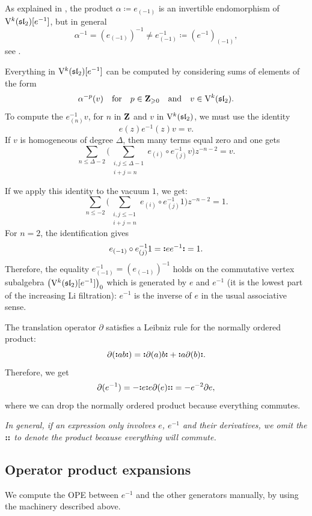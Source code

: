 As explained in \cite[Lemma 3.1 and before Lemma 3.3]{arakawa2026faithful}, the product $\alpha \coloneq e_{(-1)}$ is an invertible endomorphism of $\mathrm V^k(\mathfrak{sl}_2)[e^{-1}]$, but in general
\[ \alpha^{-1} = (e_{(-1)})^{-1} \neq e^{-1}_{(-1)} \coloneqq (e^{-1})_{(-1)}, \] 
see .

Everything in $\mathrm V^k(\mathfrak{sl}_2)[e^{-1}]$ can be computed by considering sums of elements of the form
\[ \alpha^{-p}(v) \quad \text{for} \quad p \in \mathbf{Z}_{\geqslant 0} \quad \text{and} \quad v \in \mathrm V^k(\mathfrak{sl}_2). \]
To compute the $e^{-1}_{(n)} v$, for $n$ in $\mathbf{Z}$ and $v$ in $\mathrm V^k(\mathfrak{sl}_2)$, we must use the identity
\[ e(z) e^{-1}(z) v = v. \]
If $v$ is homogeneous of degree $\Delta$, then many terms equal zero and one gets
\[ \sum_{n \leqslant \Delta - 2} \Big(\sum_{\substack{i, j \leqslant \Delta - 1 \\ i + j = n}} e_{(i)} \circ e^{-1}_{(j)} v \Big) z^{- n -2} = v. \]

If we apply this identity to the vacuum $1$, we get:
\[ \sum_{n \leqslant - 2} \Big(\sum_{\substack{i, j \leqslant - 1 \\ i + j = n}} e_{(i)} \circ e^{-1}_{(j)} 1 \Big) z^{- n -2} = 1. \]
For $n = 2$, the identification gives
\[ e_{(-1)} \circ e^{-1}_{(j)} 1 = \mathopen{\boldsymbol{\vcentcolon}} e e^{-1}\mathclose{\boldsymbol{\vcentcolon}} = 1. \]
Therefore, the equality $e^{-1}_{(-1)} = ( e_{(-1)})^{-1}$ holds on the commutative vertex subalgebra $\big(\mathrm V^k(\mathfrak{sl}_2)[e^{-1}]\big)_0$ which is generated by $e$ and $e^{-1}$ (it is the lowest part of the increasing Li filtration): $e^{-1}$ is the inverse of $e$ in the usual associative sense.

The translation operator $\partial$ satisfies a Leibniz rule for the normally ordered product:
\[ \partial(\mathopen{\boldsymbol{\vcentcolon}}ab\mathclose{\boldsymbol{\vcentcolon}}) = \mathopen{\boldsymbol{\vcentcolon}}\partial(a) b\mathclose{\boldsymbol{\vcentcolon}} + \mathopen{\boldsymbol{\vcentcolon}}a \partial(b)\mathclose{\boldsymbol{\vcentcolon}}. \]
Therefore, we get
\[ \partial(e^{-1}) = - \mathopen{\boldsymbol{\vcentcolon}}e \mathopen{\boldsymbol{\vcentcolon}}e \partial(e)\mathclose{\boldsymbol{\vcentcolon}}\mathclose{\boldsymbol{\vcentcolon}} = - e^{-2} \partial e, \]
where we can drop the normally ordered product because everything commutes.

\emph{In general, if an expression only involves $e$, $e^{-1}$ and their derivatives, we omit the $\mathopen{\boldsymbol{\vcentcolon}}\mathclose{\boldsymbol{\vcentcolon}}$ to denote the product because everything will commute.}

\subsection{Operator product expansions} \label{subsection:ope-localised-sl2}

We compute the OPE between $e^{-1}$ and the other generators manually, by using the machinery described above.

